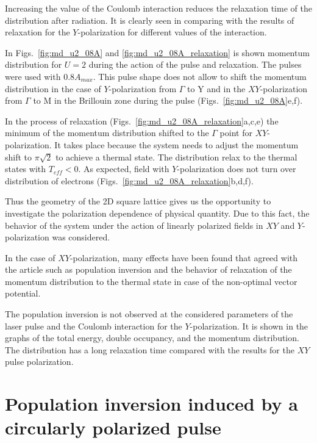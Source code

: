 Increasing the value of the Coulomb interaction reduces the relaxation time of the distribution after radiation. It is clearly seen in comparing with the results of relaxation for the $Y$-polarization for different values of the interaction.

In Figs.~\ref{fig:md_u2_08A} and \ref{fig:md_u2_08A_relaxation} is shown momentum distribution for $U=2$ during the action of the pulse and relaxation. The pulses were used with $0.8A_{max}$. This pulse shape does not allow to shift the momentum distribution in the case of $Y$-polarization from $\Gamma$ to Y and in the $XY$-polarization from $\Gamma$ to M in the Brillouin zone during the pulse (Figs.~\ref{fig:md_u2_08A}e,f).


In the process of relaxation (Figs.~\ref{fig:md_u2_08A_relaxation}a,c,e) the minimum of the momentum distribution shifted to the $\Gamma$ point for $XY$-polarization. It takes place because the system needs to adjust the momentum shift to $\pi\sqrt{2}$ to achieve a thermal state. The distribution relax to the thermal states with $T_{eff} < 0$.
As expected, field with $Y$-polarization does not turn over distribution of electrons (Figs.~\ref{fig:md_u2_08A_relaxation}b,d,f).

\vspace{5mm} %

Thus the geometry of the 2D square lattice gives us the opportunity to investigate the polarization dependence of physical quantity. Due to this fact, the behavior of the system under the action of linearly polarized fields in $XY$ and $Y$-polarization was considered.

In the case of $XY$-polarization, many effects have been found that agreed with the article \citep{PhysRevB.85.155124} such as population inversion and the behavior of relaxation of the momentum distribution to the thermal state in case of the non-optimal vector potential. 

The population inversion is not observed at the considered parameters of the laser pulse and the Coulomb interaction for the $Y$-polarization. It is shown in the graphs of the total energy, double occupancy, and the momentum distribution. The distribution has a long relaxation time compared with the results for the $XY$ pulse polarization. 





\FloatBarrier
\section{Population inversion induced by a circularly polarized pulse}

